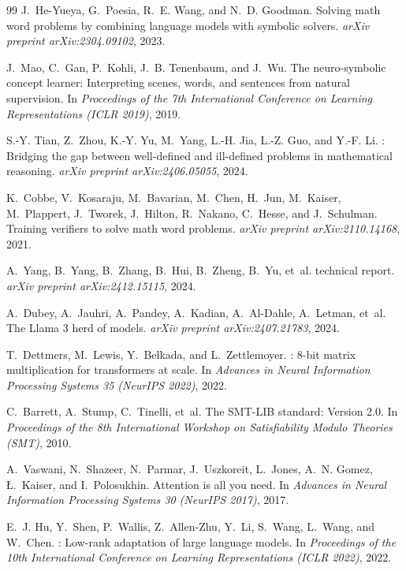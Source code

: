 \documentclass[sigconf, nonacm, onecolumn]{acmart}
\begin{document}
\begin{thebibliography}{99}
J.~He-Yueya, G.~Poesia, R.~E. Wang, and N.~D. Goodman.
\newblock Solving math word problems by combining language models with
  symbolic solvers.
\newblock \emph{arXiv preprint arXiv:2304.09102}, 2023.

J.~Mao, C.~Gan, P.~Kohli, J.~B. Tenenbaum, and J.~Wu.
\newblock The neuro-symbolic concept learner: Interpreting scenes, words,
  and sentences from natural supervision.
\newblock In \emph{Proceedings of the 7th International Conference on
  Learning Representations (ICLR 2019)}, 2019.

S.-Y. Tian, Z.~Zhou, K.-Y. Yu, M.~Yang, L.-H. Jia, L.-Z. Guo, and
  Y.-F. Li.
: Bridging the gap between well-defined and
  ill-defined problems in mathematical reasoning.
\newblock \emph{arXiv preprint arXiv:2406.05055}, 2024.

K.~Cobbe, V.~Kosaraju, M.~Bavarian, M.~Chen, H.~Jun, M.~Kaiser,
  M.~Plappert, J.~Tworek, J.~Hilton, R.~Nakano, C.~Hesse, and
  J.~Schulman.
\newblock Training verifiers to solve math word problems.
\newblock \emph{arXiv preprint arXiv:2110.14168}, 2021.

A.~Yang, B.~Yang, B.~Zhang, B.~Hui, B.~Zheng, B.~Yu, et~al.
 technical report.
\newblock \emph{arXiv preprint arXiv:2412.15115}, 2024.

A.~Dubey, A.~Jauhri, A.~Pandey, A.~Kadian, A.~Al-Dahle, A.~Letman, et~al.
\newblock The Llama 3 herd of models.
\newblock \emph{arXiv preprint arXiv:2407.21783}, 2024.

T.~Dettmers, M.~Lewis, Y.~Belkada, and L.~Zettlemoyer.
: 8-bit matrix multiplication for transformers at
  scale.
\newblock In \emph{Advances in Neural Information Processing Systems 35
  (NeurIPS 2022)}, 2022.

C.~Barrett, A.~Stump, C.~Tinelli, et~al.
\newblock The {SMT-LIB} standard: Version 2.0.
\newblock In \emph{Proceedings of the 8th International Workshop on
  Satisfiability Modulo Theories (SMT)}, 2010.

A.~Vaswani, N.~Shazeer, N.~Parmar, J.~Uszkoreit, L.~Jones, A.~N. Gomez,
  {\L}.~Kaiser, and I.~Polosukhin.
\newblock Attention is all you need.
\newblock In \emph{Advances in Neural Information Processing Systems 30
  (NeurIPS 2017)}, 2017.

E.~J. Hu, Y.~Shen, P.~Wallis, Z.~Allen-Zhu, Y.~Li, S.~Wang, L.~Wang, and
  W.~Chen.
: Low-rank adaptation of large language models.
\newblock In \emph{Proceedings of the 10th International Conference on
  Learning Representations (ICLR 2022)}, 2022.

\end{thebibliography}
\end{document}

